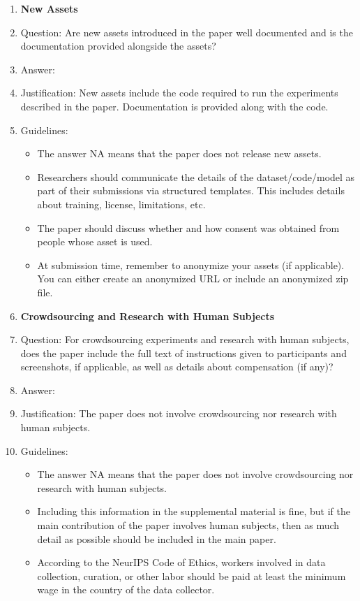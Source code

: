 \documentclass{article}
\begin{document}
\begin{enumerate}
\item {\bf New Assets}
    \item[] Question: Are new assets introduced in the paper well documented and is the documentation provided alongside the assets?
    \item[] Answer: \answerYes{} %
    \item[] Justification: New assets include the code required to run the experiments described in the paper. Documentation is provided along with the code.
    \item[] Guidelines:
    \begin{itemize}
        \item The answer NA means that the paper does not release new assets.
        \item Researchers should communicate the details of the dataset/code/model as part of their submissions via structured templates. This includes details about training, license, limitations, etc. 
        \item The paper should discuss whether and how consent was obtained from people whose asset is used.
        \item At submission time, remember to anonymize your assets (if applicable). You can either create an anonymized URL or include an anonymized zip file.
    \end{itemize}

\item {\bf Crowdsourcing and Research with Human Subjects}
    \item[] Question: For crowdsourcing experiments and research with human subjects, does the paper include the full text of instructions given to participants and screenshots, if applicable, as well as details about compensation (if any)? 
    \item[] Answer: \answerNA{} %
    \item[] Justification: The paper does not involve crowdsourcing nor research with human subjects.
    \item[] Guidelines:
    \begin{itemize}
        \item The answer NA means that the paper does not involve crowdsourcing nor research with human subjects.
        \item Including this information in the supplemental material is fine, but if the main contribution of the paper involves human subjects, then as much detail as possible should be included in the main paper. 
        \item According to the NeurIPS Code of Ethics, workers involved in data collection, curation, or other labor should be paid at least the minimum wage in the country of the data collector. 
    \end{itemize}


\end{enumerate}
\end{document}
